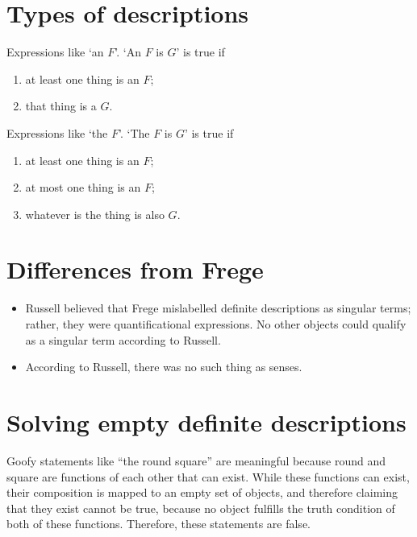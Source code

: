 \section{Types of descriptions}

\begin{definition}
Expressions like `an $F$'. `An $F$ is $G$' is true if
\begin{enumerate}
  \item at least one thing is an $F$;
  \item that thing is a $G$.
\end{enumerate}
\end{definition}

\begin{definition}
Expressions like `the $F$'. `The $F$ is $G$' is true if
\begin{enumerate}
  \item at least one thing is an $F$;
  \item at most one thing is an $F$;
  \item whatever is the thing is also $G$.
\end{enumerate}
\end{definition}

\section{Differences from Frege}

\begin{itemize}
  \item Russell believed that Frege mislabelled definite descriptions as singular terms; rather, they were quantificational expressions. No other objects could qualify as a singular term according to Russell.
  \item According to Russell, there was no such thing as senses.

\end{itemize}

\section{Solving empty definite descriptions}

Goofy statements like ``the round square'' are meaningful because round and square are functions of each other that can exist. While these functions can exist, their composition is mapped to an empty set of objects, and therefore claiming that they exist cannot be true, because no object fulfills the truth condition of both of these functions. Therefore, these statements are false.

